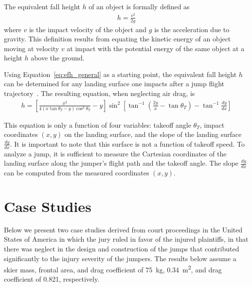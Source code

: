 \documentclass{article}
\begin{document}
The equivalent fall height $h$ of an object is formally defined as
%
\begin{align}
  h = \frac{v^2}{2g}
  \label{eq:efh_general}
\end{align}
%
where $v$ is the impact velocity of the object and $g$ is the acceleration due
to gravity. This definition results from equating the kinetic energy of an
object moving at velocity $v$ at impact with the potential energy of the same
object at a height $h$ above the ground.

Using Equation~\ref{eq:efh_general} as a starting point, the equivalent fall
height $h$ can be determined for any landing surface one impacts after a jump
flight trajectory~\cite{Hubbard2012}. The resulting equation, when neglecting
air drag, is
%
\begin{align}
  h = \left[\frac{x^2}{4(x\tan\theta_T - y)\cos^{2}\theta_T} -
    y\right]\sin^{2}\left[\tan^{-1}\left(\frac{2y}{x}- \tan\theta_T\right) - \tan^{-1}\frac{dy}{dx}\right]
  \label{eq:efh}
\end{align}

This equation is only a function of four variables: takeoff angle $\theta_T$,
impact coordinates $(x,y)$ on the landing surface, and the slope of the landing
surface $\frac{dy}{dx}$. It is important to note that this surface is not a
function of takeoff speed. To analyze a jump, it is sufficient to measure the
Cartesian coordinates of the landing surface along the jumper's flight path and
the takeoff angle. The slope $\frac{dy}{dx}$ can be computed from the measured
coordinates $(x,y)$.

\section{Case Studies}
%
Below we present two case studies derived from court proceedings in the United
States of America in which the jury ruled in favor of the injured plaintiffs,
in that there was neglect in the design and construction of the jumps that
contributed significantly to the injury severity of the jumpers. The results
below assume a skier mass, frontal area, and drag coefficient of 75~\si{\kg},
0.34~\si{\meter\squared}, and drag coefficient of 0.821, respectively.
\end{document}
